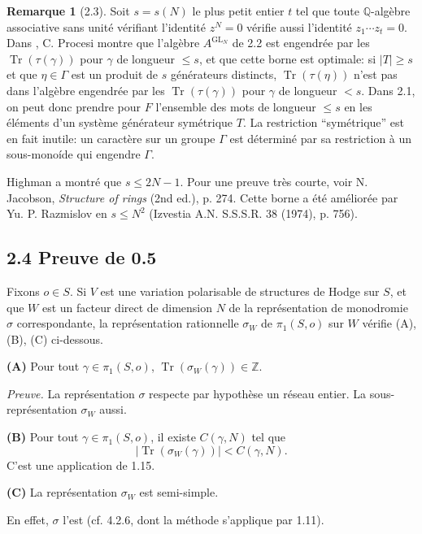 \documentclass[12pt,a4paper]{article}
\theoremstyle{plain}
\theoremstyle{definition}
\newtheorem{remark}{Remarque}[section]
\DeclareMathOperator{\Tr}{Tr}
\DeclareMathOperator{\GL}{GL}
\newcommand{\QQ}{\mathbb{Q}}
\newcommand{\ZZ}{\mathbb{Z}}
\begin{document}
\begin{remark}[2.3]
Soit $s = s(N)$ le plus petit entier $t$ tel que toute $\QQ$-alg\`{e}bre associative sans unit\'{e} v\'{e}rifiant l'identit\'{e} $z^{N} = 0$ v\'{e}rifie aussi l'identit\'{e} $z_{1} \cdots z_{t} = 0$. Dans \cite{Procesi}, C. Procesi montre que l'alg\`{e}bre $A^{\GL_{N}}$ de 2.2 est engendr\'{e}e par les $\Tr(\tau(\gamma))$ pour $\gamma$ de longueur $\leq s$, et que cette borne est optimale: si $|T| \geq s$ et que $\eta \in \Gamma$ est un produit de $s$ g\'{e}n\'{e}rateurs distincts, $\Tr(\tau(\eta))$ n'est pas dans l'alg\`{e}bre engendr\'{e}e par les $\Tr(\tau(\gamma))$ pour $\gamma$ de longueur $< s$. Dans 2.1, on peut donc prendre pour $F$ l'ensemble des mots de longueur $\leq s$ en les \'{e}l\'{e}ments d'un syst\`{e}me g\'{e}n\'{e}rateur sym\'{e}trique $T$. La restriction ``sym\'{e}trique'' est en fait inutile: un caract\`{e}re sur un groupe $\Gamma$ est d\'{e}termin\'{e} par sa restriction \`{a} un sous-mono\'{i}de qui engendre $\Gamma$.

Highman a montr\'{e} que $s \leq 2N - 1$. Pour une preuve tr\`{e}s courte, voir N. Jacobson, \textit{Structure of rings} (2nd ed.), p. 274. Cette borne a \'{e}t\'{e} am\'{e}lior\'{e}e par Yu. P. Razmislov en $s \leq N^{2}$ (Izvestia A.N. S.S.S.R. 38 (1974), p. 756).
\end{remark}

\subsection*{2.4 Preuve de 0.5}
Fixons $o \in S$. Si $V$ est une variation polarisable de structures de Hodge sur $S$, et que $W$ est un facteur direct de dimension $N$ de la repr\'{e}sentation de monodromie $\sigma$ correspondante, la repr\'{e}sentation rationnelle $\sigma_{W}$ de $\pi_{1}(S,o)$ sur $W$ v\'{e}rifie (A), (B), (C) ci-dessous.

\textbf{(A)} Pour tout $\gamma \in \pi_{1}(S,o)$, $\Tr(\sigma_{W}(\gamma)) \in \ZZ$.

\textit{Preuve.} La repr\'{e}sentation $\sigma$ respecte par hypoth\`{e}se un r\'{e}seau entier. La sous-repr\'{e}sentation $\sigma_{W}$ aussi.

\textbf{(B)} Pour tout $\gamma \in \pi_{1}(S,o)$, il existe $C(\gamma, N)$ tel que
\[
|\Tr(\sigma_{W}(\gamma))| < C(\gamma, N).
\]
C'est une application de 1.15.

\textbf{(C)} La repr\'{e}sentation $\sigma_{W}$ est semi-simple.

En effet, $\sigma$ l'est (cf. \cite{HodgeII} 4.2.6, dont la m\'{e}thode s'applique par 1.11).
\end{document}

